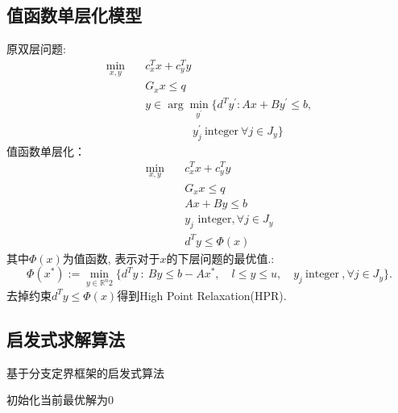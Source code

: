 \documentclass{article}
\begin{document}
\subsection{值函数单层化模型}
原双层问题:
\begin{align*}
    \min_{x,y}\quad &c_{x}^{T}x+c_{y}^{T}y \\
    &G_{x}x \leq q  \\
    &y \in\operatorname{arg}\operatorname*{min}_{y^{\prime}}\{d^{T}y^{\prime}:Ax+By^{\prime}\leq b,\\
    &~~~~~~~~~~~~~~~~~~~y_{j}^{\prime}{\mathrm{~integer~}}\forall j\in J_{y}\} 
\end{align*}
值函数单层化：
\begin{align*}
    \operatorname*{min}_{x,y}\quad &c_{x}^{T}x+c_{y}^{T}y \\
    &G_{x}x \leq q  \\
    &Ax+By\leq b \\
    &y_{j}\text{ integer},\forall j\in J_{y} \\
    &d^{T}y\leq\Phi(x)
\end{align*}
其中$\Phi(x)$为值函数, 表示对于$x$的下层问题的最优值.:
$$
\Phi(x^*):=\min_{y\in\mathbb{R}^n2}\{d^Ty~:~By\leq b-Ax^*,\quad l\leq y\leq u,\quad y_j\mathrm{~integer~},\forall j\in J_y\}.
$$
去掉约束$d^Ty\leq\Phi(x)$得到High Point Relaxation(HPR).

\subsection{启发式求解算法}

\begin{algorithm}[H]
    \caption{基于分支定界框架的启发式算法}%
    \LinesNumbered %
    初始化当前最优解为0\;
\end{algorithm}
\end{document}
